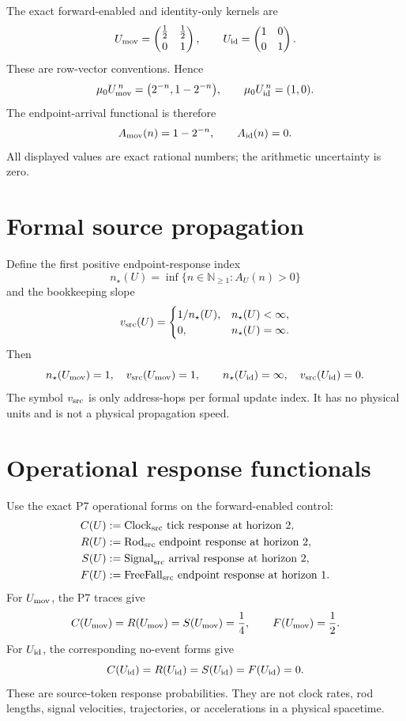 \documentclass[11pt]{article}
\newcommand{\Clock}{\mathrm{Clock}_{\rm src}}
\newcommand{\Rod}{\mathrm{Rod}_{\rm src}}
\newcommand{\Signal}{\mathrm{Signal}_{\rm src}}
\newcommand{\FreeFall}{\mathrm{FreeFall}_{\rm src}}
\begin{document}
The exact forward-enabled and identity-only kernels are
\[
 U_{\rm mov}=
 \begin{pmatrix}
  \tfrac12&\tfrac12\\[2pt]
  0&1
 \end{pmatrix},
 \qquad
 U_{\rm id}=
 \begin{pmatrix}
  1&0\\[2pt]
  0&1
 \end{pmatrix}.
\]
These are row-vector conventions.  Hence
\[
 \mu_0 U_{\rm mov}^{\,n}
   =\bigl(2^{-n},1-2^{-n}\bigr),\qquad
 \mu_0 U_{\rm id}^{\,n}=(1,0).
\]
The endpoint-arrival functional is therefore
\[
 A_{\rm mov}(n)=1-2^{-n},\qquad A_{\rm id}(n)=0 .
\]
All displayed values are exact rational numbers; the arithmetic uncertainty
is zero.

\section{Formal source propagation}

Define the first positive endpoint-response index
\[
 n_\star(U)=\inf\{n\in\mathbb N_{\geq 1}:A_U(n)>0\}
\]
and the bookkeeping slope
\[
 v_{\rm src}(U)=
 \begin{cases}
  1/n_\star(U),&n_\star(U)<\infty,\\
  0,&n_\star(U)=\infty.
 \end{cases}
\]
Then
\[
 n_\star(U_{\rm mov})=1,\quad v_{\rm src}(U_{\rm mov})=1,
 \qquad
 n_\star(U_{\rm id})=\infty,\quad v_{\rm src}(U_{\rm id})=0.
\]
The symbol \(v_{\rm src}\) is only address-hops per formal update index.  It
has no physical units and is not a physical propagation speed.

\section{Operational response functionals}

Use the exact P7 operational forms on the forward-enabled control:
\[
\begin{aligned}
 C(U)&:=\Clock\text{ tick response at horizon }2,\\
 R(U)&:=\Rod\text{ endpoint response at horizon }2,\\
 S(U)&:=\Signal\text{ arrival response at horizon }2,\\
 F(U)&:=\FreeFall\text{ endpoint response at horizon }1.
\end{aligned}
\]
For \(U_{\rm mov}\), the P7 traces give
\[
 C(U_{\rm mov})=R(U_{\rm mov})=S(U_{\rm mov})=\frac14,
 \qquad F(U_{\rm mov})=\frac12.
\]
For \(U_{\rm id}\), the corresponding no-event forms give
\[
 C(U_{\rm id})=R(U_{\rm id})=S(U_{\rm id})=F(U_{\rm id})=0.
\]
These are source-token response probabilities.  They are not clock rates,
rod lengths, signal velocities, trajectories, or accelerations in a physical
spacetime.
\end{document}
